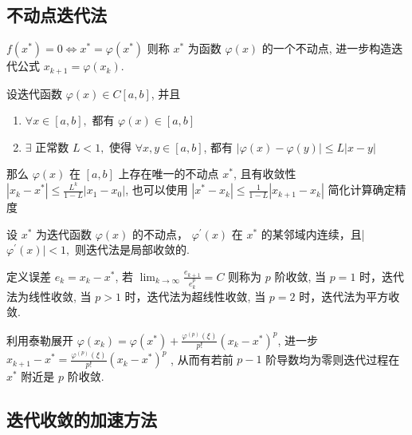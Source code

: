 \documentclass[10pt]{yerbaformat}
\begin{document}
\subsection{不动点迭代法}

\par $f\left(x^{*}\right)=0 \Leftrightarrow x^{*}=\varphi\left(x^{*}\right)$ 则称 $x^{*}$ 为函数 $\varphi(x)$ 的一个不动点, 进一步构造迭代公式 $x_{k+1}=\varphi\left(x_{k}\right)$.

\begin{theorem}[不动点存在性与唯一性]
    设迭代函数 $\varphi(x) \in C[a, b]$, 并且
    \begin{enumerate}
        \item $\forall x \in[a, b],$ 都有 $\varphi(x) \in[a, b]$
        \item $\exists$ 正常数 $L<1,$ 使得 $\forall x, y \in[a, b]$, 都有 $|\varphi(x)-\varphi(y)| \leq L|x-y|$
    \end{enumerate}
    那么 $\varphi(x)$ 在 $[a, b]$ 上存在唯一的不动点 $x^{*}$, 且有收敛性 $\left|x_{k}-x^{*}\right| \leq \frac{L^{k}}{1-L}\left|x_{1}-x_{0}\right|$, 也可以使用 $\left|x^{*}-x_{k}\right| \leq \frac{1}{1-L}\left|x_{k+1}-x_{k}\right|$ 简化计算确定精度
\end{theorem}

\begin{definition}[局部收敛]
    设 $x^{*}$ 为迭代函数 $\varphi(x)$ 的不动点， $\varphi^{\prime}(x)$ 在 $x^{*}$ 的某邻域内连续，且| $\varphi^{\prime}(x) \mid<1,$ 则迭代法是局部收敛的.
\end{definition}

\begin{definition}
    定义误差 $e_{k}=x_{k}-x^{*}$, 若 $\lim _{k \rightarrow \infty} \frac{e_{k+1}}{e_{k}^{p}}=C$ 则称为 $p$ 阶收敛, 当 $p=1$ 时，迭代法为线性收敛, 当 $p>1$ 时，迭代法为超线性收敛, 当 $p=2$ 时，迭代法为平方收敛.
\end{definition}

\begin{theorem}
    利用泰勒展开 $\varphi\left(x_{k}\right)=\varphi\left(x^{*}\right)+\frac{\varphi^{(p)}(\xi)}{p !}\left(x_{k}-x^{*}\right)^{p}$, 进一步 $x_{k+1}-x^{*}=\frac{\varphi^{(p)}(\xi)}{p !}\left(x_{k}-x^{*}\right)^{p}$ , 从而有若前 $p-1$ 阶导数均为零则迭代过程在 $x^{*}$ 附近是 $p$ 阶收敛.
\end{theorem}

\subsection{迭代收敛的加速方法}
\end{document}
